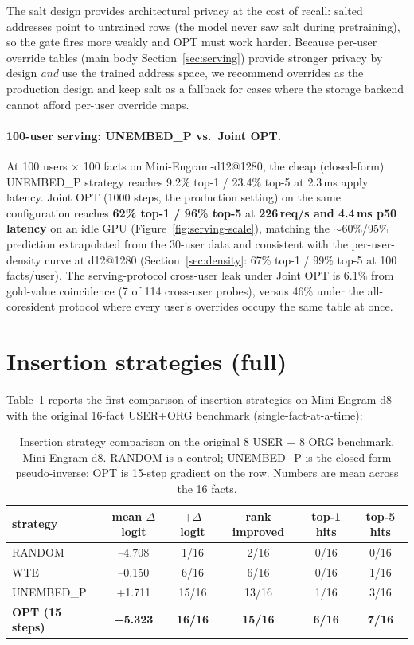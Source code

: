 \documentclass[letterpaper]{article} %
\begin{document}
The salt design provides architectural privacy at the cost of
recall: salted addresses point to untrained rows (the model
never saw salt during pretraining), so the gate fires more
weakly and OPT must work harder. Because per-user override
tables (main body Section~\ref{sec:serving}) provide stronger
privacy by design \emph{and} use the trained address
space, we recommend overrides as the production design and keep
salt as a fallback for cases where the storage backend cannot
afford per-user override maps.

\paragraph{100-user serving: UNEMBED\_P vs.\ Joint OPT.}
At 100 users $\times$ 100 facts on Mini-Engram-d12@1280, the
cheap (closed-form) UNEMBED\_P strategy reaches 9.2\% top-1 /
23.4\% top-5 at 2.3\,ms apply latency. Joint OPT (1000 steps,
the production setting) on the same configuration reaches
\textbf{62\% top-1 / 96\% top-5} at \textbf{226\,req/s and
4.4\,ms p50 latency} on an idle GPU
(Figure~\ref{fig:serving-scale}), matching the $\sim$60\%/95\%
prediction extrapolated from the 30-user data and consistent
with the per-user-density curve at d12@1280
(Section~\ref{sec:density}: 67\% top-1 / 99\% top-5
at 100 facts/user). The serving-protocol cross-user leak under
Joint OPT is 6.1\% from gold-value coincidence (7 of 114
cross-user probes), versus 46\% under the all-coresident
protocol where every user's overrides occupy the same table at
once.

\section{Insertion strategies (full)}
\label{app:strategies-full}

Table~\ref{tab:strategies-full} reports the first comparison of
insertion strategies on Mini-Engram-d8 with
the original 16-fact USER+ORG benchmark (single-fact-at-a-time):

\begin{table}[t]
  \centering
  \caption{Insertion strategy comparison on the original 8 USER + 8 ORG
  benchmark, Mini-Engram-d8. RANDOM is a control; UNEMBED\_P is the
  closed-form pseudo-inverse; OPT is 15-step gradient on the row.
  Numbers are mean across the 16 facts.}
  \label{tab:strategies-full}
  \begin{tabular}{lccccc}
    \toprule
    strategy & mean $\Delta$logit & $+\Delta$logit & rank improved & top-1 hits & top-5 hits \\
    \midrule
    RANDOM   & --4.708 & 1/16 & 2/16 & 0/16 & 0/16 \\
    WTE      & --0.150 & 6/16 & 6/16 & 0/16 & 1/16 \\
    UNEMBED\_P & +1.711 & 15/16 & 13/16 & 1/16 & 3/16 \\
    \textbf{OPT (15 steps)} & \textbf{+5.323} & \textbf{16/16} & \textbf{15/16} & \textbf{6/16} & \textbf{7/16} \\
    \bottomrule
  \end{tabular}
\end{table}
\end{document}
